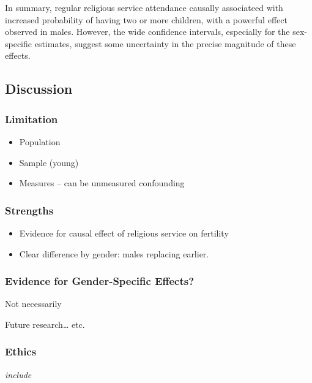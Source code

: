 \documentclass[
  single column]{article}
\providecommand{\tightlist}{%
  \setlength{\itemsep}{0pt}\setlength{\parskip}{0pt}}\usepackage{longtable,booktabs,array}
\begin{document}
In summary, regular religious service attendance causally associateed
with increased probability of having two or more children, with a
powerful effect observed in males. However, the wide confidence
intervals, especially for the sex-specific estimates, suggest some
uncertainty in the precise magnitude of these effects.

\subsection{Discussion}\label{discussion}

\subsubsection{Limitation}\label{limitation}

\begin{itemize}
\tightlist
\item
  Population
\item
  Sample (young)
\item
  Measures -- can be unmeasured confounding
\end{itemize}

\subsubsection{Strengths}\label{strengths}

\begin{itemize}
\tightlist
\item
  Evidence for causal effect of religious service on fertility
\item
  Clear difference by gender: males replacing earlier.
\end{itemize}

\subsubsection{Evidence for Gender-Specific
Effects?}\label{evidence-for-gender-specific-effects}

Not necessarily

Future research\ldots{} etc.

\newpage{}

\subsubsection{Ethics}\label{ethics}

\emph{include}
\end{document}

